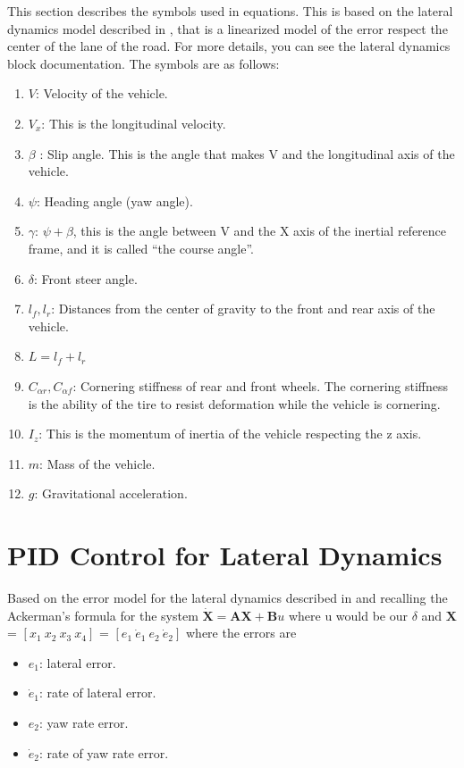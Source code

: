 \documentclass[12pt,a4paper]{cibb}
\begin{document}
This section describes the symbols used in equations. This is based on the lateral dynamics model described in \cite{rajamani2011vehicle}, that is a linearized model of the error respect the center of the lane of the road. For more details, you can see the lateral dynamics block documentation. The symbols are as follows:
\begin{enumerate}
     \item	\(V\): Velocity of the vehicle.
     \item	\(V_x\): This is the longitudinal velocity.
     \item	\(\beta\) : Slip angle. This is the angle that makes V and the longitudinal axis of the vehicle.
     \item	\(\psi\): Heading angle (yaw angle).
     \item	\(\gamma\): \(\psi+ \beta\), this is the angle between V and the X axis of the inertial reference frame, and it is called “the course angle”.
     \item	\(\delta\): Front steer angle.
     \item	\(l_f,l_r\): Distances from the center of gravity to the front and rear axis of the vehicle.
     \item	\(L= l_f+l_r\)
     \item	\(C_{\alpha r}, C_{\alpha f}\): Cornering stiffness of rear and front wheels. The cornering stiffness is the ability of the tire to resist deformation while the vehicle is cornering.
     \item	\(I_z\): This is the momentum of inertia of the vehicle respecting the z axis.
     \item   \(m\): Mass of the vehicle.
     \item  \(g\): Gravitational acceleration.
\end{enumerate}


\section{PID Control for Lateral Dynamics}

Based on the error model for the lateral dynamics described in \cite{rajamani2011vehicle} and recalling the Ackerman’s formula for the system \(\dot{\textbf{X}} =\textbf{A}\textbf{X}+\textbf{B}u\) where u would be our \(\delta\) and $\textbf{X} $ = $ [x_1\ x_2\   x_3\ x_4] $ = $ [e_1\ \dot{e}_1\ e_2\ \dot{e}_2]$ where the errors are 
\begin{itemize}
  \item $e_1$: lateral error.
  \item $\dot{e}_1$: rate of lateral error.
  \item $e_2$: yaw rate error.
  \item $\dot{e}_2$: rate of yaw rate error.
\end{itemize}
\end{document}
